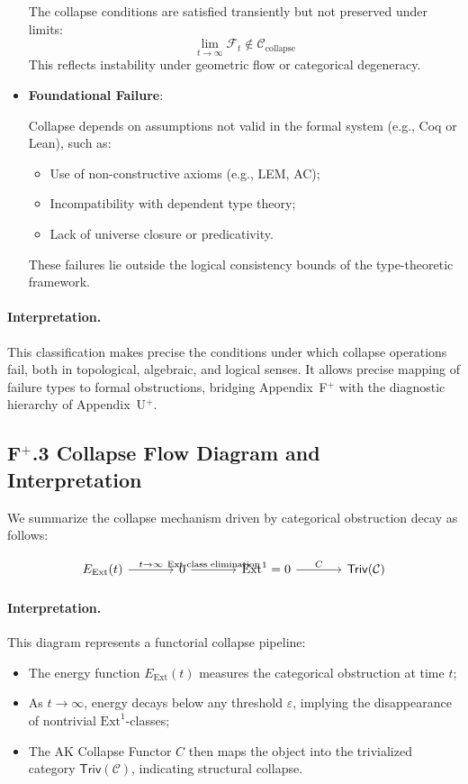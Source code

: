 \documentclass[11pt]{article}
\begin{document}
\begin{itemize}
    The collapse conditions are satisfied transiently but not preserved under limits:
    \[
    \lim_{t \to \infty} \mathcal{F}_t \notin \mathcal{C}_{\mathrm{collapse}}
    \]
    This reflects instability under geometric flow or categorical degeneracy.

    \item \textbf{Foundational Failure}:
    
    Collapse depends on assumptions not valid in the formal system (e.g., Coq or Lean), such as:
    \begin{itemize}
        \item Use of non-constructive axioms (e.g., LEM, AC);
        \item Incompatibility with dependent type theory;
        \item Lack of universe closure or predicativity.
    \end{itemize}
    These failures lie outside the logical consistency bounds of the type-theoretic framework.
\end{itemize}

\paragraph{Interpretation.} This classification makes precise the conditions under which collapse operations fail, both in topological, algebraic, and logical senses. It allows precise mapping of failure types to formal obstructions, bridging Appendix~F$^+$ with the diagnostic hierarchy of Appendix~U$^+$.


\subsection*{F$^+$.3 Collapse Flow Diagram and Interpretation}

We summarize the collapse mechanism driven by categorical obstruction decay as follows:

\[
\begin{tikzcd}[column sep=large]
E_{\mathrm{Ext}}(t) \arrow[r, "t \to \infty"] 
& 0 \arrow[r, "\text{Ext-class elimination}"] 
& \mathrm{Ext}^1 = 0 \arrow[r, "C"]
& \mathsf{Triv}(\mathcal{C})
\end{tikzcd}
\]

\paragraph{Interpretation.}
This diagram represents a functorial collapse pipeline:
\begin{itemize}
  \item The energy function \( E_{\mathrm{Ext}}(t) \) measures the categorical obstruction at time \( t \);
  \item As \( t \to \infty \), energy decays below any threshold \( \varepsilon \), implying the disappearance of nontrivial \( \mathrm{Ext}^1 \)-classes;
  \item The AK Collapse Functor \( C \) then maps the object into the trivialized category \( \mathsf{Triv}(\mathcal{C}) \), indicating structural collapse.
\end{itemize}
\end{document}
